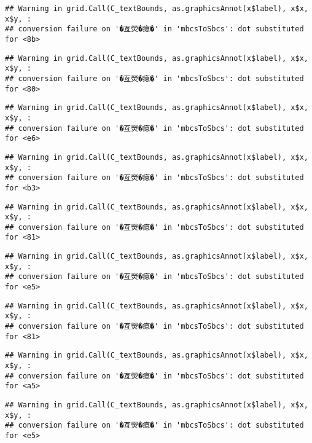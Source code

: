 \documentclass[
]{article}
\begin{document}
\begin{verbatim}
## Warning in grid.Call(C_textBounds, as.graphicsAnnot(x$label), x$x, x$y, :
## conversion failure on '�亙熒�瘜�' in 'mbcsToSbcs': dot substituted for <8b>
\end{verbatim}

\begin{verbatim}
## Warning in grid.Call(C_textBounds, as.graphicsAnnot(x$label), x$x, x$y, :
## conversion failure on '�亙熒�瘜�' in 'mbcsToSbcs': dot substituted for <80>
\end{verbatim}

\begin{verbatim}
## Warning in grid.Call(C_textBounds, as.graphicsAnnot(x$label), x$x, x$y, :
## conversion failure on '�亙熒�瘜�' in 'mbcsToSbcs': dot substituted for <e6>
\end{verbatim}

\begin{verbatim}
## Warning in grid.Call(C_textBounds, as.graphicsAnnot(x$label), x$x, x$y, :
## conversion failure on '�亙熒�瘜�' in 'mbcsToSbcs': dot substituted for <b3>
\end{verbatim}

\begin{verbatim}
## Warning in grid.Call(C_textBounds, as.graphicsAnnot(x$label), x$x, x$y, :
## conversion failure on '�亙熒�瘜�' in 'mbcsToSbcs': dot substituted for <81>
\end{verbatim}

\begin{verbatim}
## Warning in grid.Call(C_textBounds, as.graphicsAnnot(x$label), x$x, x$y, :
## conversion failure on '�亙熒�瘜�' in 'mbcsToSbcs': dot substituted for <e5>
\end{verbatim}

\begin{verbatim}
## Warning in grid.Call(C_textBounds, as.graphicsAnnot(x$label), x$x, x$y, :
## conversion failure on '�亙熒�瘜�' in 'mbcsToSbcs': dot substituted for <81>
\end{verbatim}

\begin{verbatim}
## Warning in grid.Call(C_textBounds, as.graphicsAnnot(x$label), x$x, x$y, :
## conversion failure on '�亙熒�瘜�' in 'mbcsToSbcs': dot substituted for <a5>
\end{verbatim}

\begin{verbatim}
## Warning in grid.Call(C_textBounds, as.graphicsAnnot(x$label), x$x, x$y, :
## conversion failure on '�亙熒�瘜�' in 'mbcsToSbcs': dot substituted for <e5>
\end{verbatim}
\end{document}

